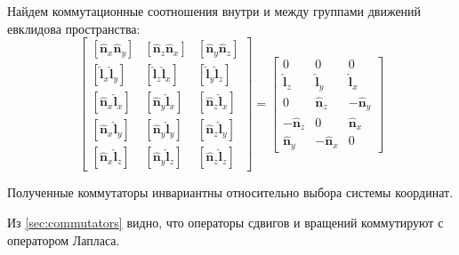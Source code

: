\documentclass[12pt,a4paper]{article}
\newcommand{\V}[1]{\mathbf{#1}}
\newcommand{\Op}[1]{\hat{\V{#1}}}
\begin{document}
        Найдем коммутационные соотношения внутри и между группами движений евклидова пространства:
        \begin{equation}
            \begin{bmatrix}
                [ \Op{n}_x \Op{n}_y ] & [ \Op{n}_z \Op{n}_x ] & [ \Op{n}_y \Op{n}_z ] \\
                [ \Op{l}_x \Op{l}_y ] & [ \Op{l}_z \Op{l}_x ] & [ \Op{l}_y \Op{l}_z ] \\
                [ \Op{n}_x \Op{l}_x ] & [ \Op{n}_y \Op{l}_x ] & [ \Op{n}_z \Op{l}_x ] \\
                [ \Op{n}_x \Op{l}_y ] & [ \Op{n}_y \Op{l}_y ] & [ \Op{n}_z \Op{l}_y ] \\
                [ \Op{n}_x \Op{l}_z ] & [ \Op{n}_y \Op{l}_z ] & [ \Op{n}_z \Op{l}_z ]
            \end{bmatrix}
            =
            \begin{bmatrix}
                0          &   0        &   0        \\
                  \Op{l}_z &   \Op{l}_y &   \Op{l}_x \\
                0          &   \Op{n}_z & - \Op{n}_y \\
                - \Op{n}_z &   0        &   \Op{n}_x \\
                  \Op{n}_y & - \Op{n}_x &   0
            \end{bmatrix}
        \end{equation}

        Полученные коммутаторы инвариантны относительно выбора системы координат.

        Из \autoref{sec:commutators} видно, что операторы сдвигов и вращений коммутируют с оператором Лапласа.
\end{document}

